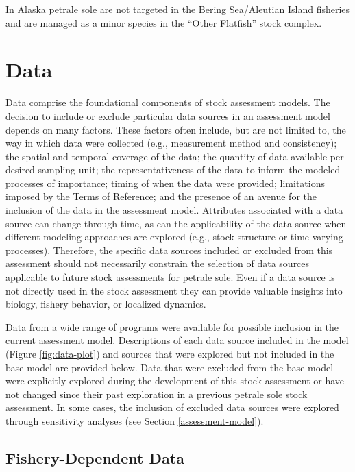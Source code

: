 \documentclass[11pt,
  english,
  letterpaper,
]{article}
\begin{document}
In Alaska petrale sole are not targeted in the Bering Sea/Aleutian Island fisheries and are managed as a minor species in the ``Other Flatfish'' stock complex.

\hypertarget{data}{%
\section{Data}\label{data}}

Data comprise the foundational components of stock assessment models. The decision to include or exclude particular data sources in an assessment model depends on many factors. These factors often include, but are not limited to, the way in which data were collected (e.g., measurement method and consistency); the spatial and temporal coverage of the data; the quantity of data available per desired sampling unit; the representativeness of the data to inform the modeled processes of importance; timing of when the data were provided; limitations imposed by the Terms of Reference; and the presence of an avenue for the inclusion of the data in the assessment model. Attributes associated with a data source can change through time, as can the applicability of the data source when different modeling approaches are explored (e.g., stock structure or time-varying processes). Therefore, the specific data sources included or excluded from this assessment should not necessarily constrain the selection of data sources applicable to future stock assessments for petrale sole. Even if a data source is not directly used in the stock assessment they can provide valuable insights into biology, fishery behavior, or localized dynamics.

Data from a wide range of programs were available for possible inclusion in the current assessment model. Descriptions of each data source included in the model (Figure \ref{fig:data-plot}) and sources that were explored but not included in the base model are provided below. Data that were excluded from the base model were explicitly explored during the development of this stock assessment or have not changed since their past exploration in a previous petrale sole stock assessment. In some cases, the inclusion of excluded data sources were explored through sensitivity analyses (see Section \ref{assessment-model}).

\hypertarget{fishery-dependent-data}{%
\subsection{Fishery-Dependent Data}\label{fishery-dependent-data}}
\end{document}
